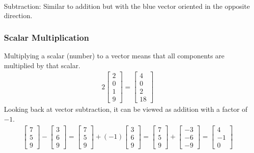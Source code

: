 \begin{center}
\\
Subtraction: Similar to addition but with the blue vector oriented in the opposite direction.
\end{center}

\subsubsection{Scalar Multiplication} 
Multiplying a scalar (number) to a vector means that all components are multiplied by that scalar.
\begin{align*}
2
\begin{bmatrix}
2 \\
0 \\
1 \\
9
\end{bmatrix}
=
\begin{bmatrix}
4 \\
0 \\
2 \\
18
\end{bmatrix}
\end{align*}
Looking back at vector subtraction, it can be viewed as addition with a factor of $-1$.
\begin{align*}
\begin{bmatrix}
7 \\
5 \\
9
\end{bmatrix}
-
\begin{bmatrix}
3 \\
6 \\
9
\end{bmatrix}
=
\begin{bmatrix}
7 \\
5 \\
9
\end{bmatrix}
+ (-1)
\begin{bmatrix}
3 \\
6 \\
9
\end{bmatrix}
=
\begin{bmatrix}
7 \\
5 \\
9
\end{bmatrix}
+
\begin{bmatrix}
-3 \\
-6 \\
-9
\end{bmatrix}
=
\begin{bmatrix}
4 \\
-1 \\
0
\end{bmatrix}
\end{align*}

